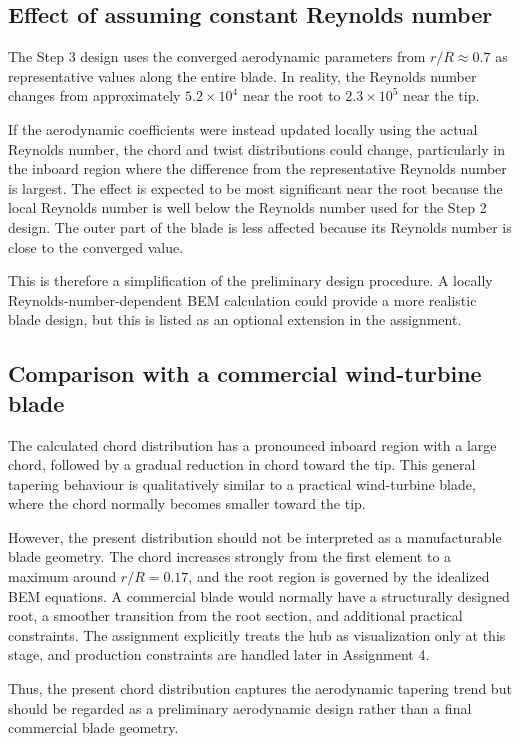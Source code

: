\documentclass[11pt,a4paper]{article}
\begin{document}
\subsection{Effect of assuming constant Reynolds number}

The Step 3 design uses the converged aerodynamic parameters from
$r/R\approx0.7$ as representative values along the entire blade. In reality,
the Reynolds number changes from approximately $5.2\times10^4$ near the
root to $2.3\times10^5$ near the tip.

If the aerodynamic coefficients were instead updated locally using the
actual Reynolds number, the chord and twist distributions could change,
particularly in the inboard region where the difference from the
representative Reynolds number is largest. The effect is expected to be
most significant near the root because the local Reynolds number is well
below the Reynolds number used for the Step 2 design. The outer part of the
blade is less affected because its Reynolds number is close to the
converged value.

This is therefore a simplification of the preliminary design procedure.
A locally Reynolds-number-dependent BEM calculation could provide a more
realistic blade design, but this is listed as an optional extension in the
assignment.

\subsection{Comparison with a commercial wind-turbine blade}

The calculated chord distribution has a pronounced inboard region with a
large chord, followed by a gradual reduction in chord toward the tip. This
general tapering behaviour is qualitatively similar to a practical
wind-turbine blade, where the chord normally becomes smaller toward the
tip.

However, the present distribution should not be interpreted as a
manufacturable blade geometry. The chord increases strongly from the first
element to a maximum around $r/R=0.17$, and the root region is governed by
the idealized BEM equations. A commercial blade would normally have a
structurally designed root, a smoother transition from the root section,
and additional practical constraints. The assignment explicitly treats
the hub as visualization only at this stage, and production constraints are
handled later in Assignment 4.

Thus, the present chord distribution captures the aerodynamic tapering
trend but should be regarded as a preliminary aerodynamic design rather
than a final commercial blade geometry.
\end{document}
